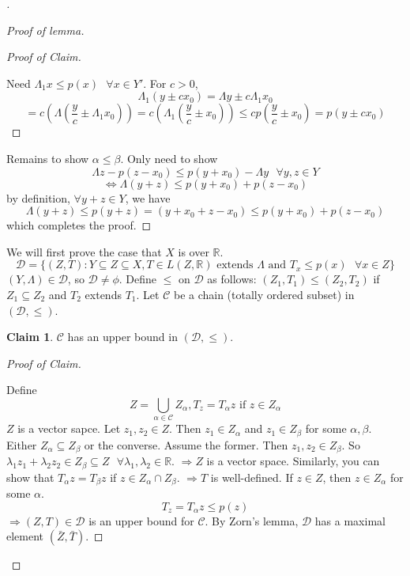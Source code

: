 \documentclass{article}
\theoremstyle{definition}
\newtheorem*{clm}{Claim}
\newenvironment{proofs}[1][\proofname]{%
  \begin{proof}[#1]$ $\par\nobreak\ignorespaces
}{%
  \end{proof}
}
\newcommand{\sfa}{\text{  } \forall}
\begin{document}
\begin{proofs}
\begin{proofs}[Proof of lemma]
		\begin{proofs}[Proof of Claim]
			Need $\Lambda_1 x \leq p(x) \sfa x \in Y'$.
			For $c > 0$, 
			\[
				\Lambda_1 (y \pm c x_0) = \Lambda y \pm c \Lambda_1x_0
			\]
			\[
				= c\left( \Lambda \left(\frac{y}{c} \pm \Lambda_1 x_0 \right) \right) = c\left(\Lambda_1 \left(\frac{y}{c} \pm x_0\right) \right) \leq c p\left(\frac{y}{c} \pm x_0\right) = p(y \pm c x_0)
			\]
		\end{proofs}
		Remains to show $\alpha \leq \beta$.
		Only need to show 
		\[
			\Lambda z - p(z - x_0) \leq p(y + x_0) - \Lambda y \sfa y, z \in Y
		\]
		\[
			\Leftrightarrow \Lambda (y + z) \leq p (y + x_0) + p(z - x_0)
		\]
		by definition, $\forall y + z \in Y$, we have
		\[
			\Lambda (y + z) \leq p (y + z) = (y + x_0 + z - x_0) \leq p(y + x_0) + p(z - x_0)
		\]
		which completes the proof. 

	\end{proofs}

	We will first prove the case that $X$ is over $\mathbb{R}$.
	\[
		\mathcal{D} = \{ (Z, T): Y \subseteq Z \subseteq X, T \in L(Z, \mathbb{R}) \text{ extends } \Lambda \text{ and } T_x \leq p(x) \sfa x \in Z \}
	\]
	$(Y, \Lambda) \in \mathcal{D}$, so $\mathcal{D} \neq \phi$.
	Define $\leq$ on $\mathcal{D}$ as follows:
	$(Z_1, T_1) \leq (Z_2, T_2)$ if $Z_1 \subseteq Z_2$ and $T_2$ extends $T_1$.
	Let $\mathcal{C}$ be a chain (totally ordered subset) in $(\mathcal{D}, \leq)$.
	\begin{clm}
		$\mathcal{C}$ has an upper bound in $(\mathcal{D}, \leq)$.
	\end{clm}

	\begin{proofs}[Proof of Claim]
		Define 
		\[
			Z = \bigcup_{\alpha \in \mathcal{C}} Z_\alpha, T_z = T_\alpha z \text{ if } z \in Z_\alpha
		\]
		$Z$ is a vector sapce.
		Let $z_1, z_2 \in Z$. 
		Then $z_1 \in Z_\alpha$ and $z_1 \in Z_\beta$ for some $\alpha, \beta$. 
		Either $Z_\alpha \subseteq Z_\beta$ or the converse.
		Assume the former.
		Then $z_1, z_2 \in Z_\beta$.
		So $\lambda_1 z_1 + \lambda_2 z_2 \in Z_\beta \subseteq Z \sfa \lambda_1, \lambda_2 \in \mathbb{R}$.
		$\Rightarrow Z$ is a vector space.
		Similarly, you can show that $T_\alpha z = T_\beta z$ if $z \in Z_\alpha \cap Z_\beta$. 
		$\Rightarrow T$ is well-defined.
		If $z \in Z$, then $z \in Z_\alpha$ for some $\alpha$.
		\[
			T_z = T_\alpha z \leq p(z)
		\]
		$\Rightarrow (Z, T) \in \mathcal{D}$ is an upper bound for $\mathcal{C}$.
		By Zorn's lemma, $\mathcal{D}$ has a maximal element $(\bar{Z}, \bar{T})$.
		

\end{proofs}
\end{proofs}
\end{document}
